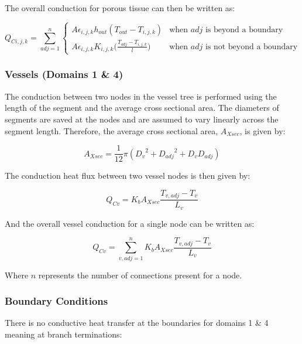 \documentclass[11pt,english,a4paper,twoside,openright]{report}
\begin{document}
{{{{{{{{The overall conduction for porous tissue can then be written as:

\begin{equation}
Q_{Ci,j,k}=\sum_{adj=1}^{n}
\begin{cases}
A\epsilon_{i,j,k}h_{out}(T_{out}-T_{i,j,k}) & \text{when $adj$ is beyond a boundary} \\
A\epsilon_{i,j,k} K_{i,j,k}\big(\frac{T_{adj}-T_{i,j,k}}{l}\big) & \text{when $adj$ is not beyond a boundary}
\end{cases}
\end{equation}

\subsubsection{Vessels (Domains 1 \& 4)}

The conduction between two nodes in the vessel tree is performed using the length of the segment and the average cross sectional area. The diameters of segments are saved at the nodes and are assumed to vary linearly across the segment length. Therefore, the average cross sectional area, $A_{Xsec}$, is given by:

\begin{equation}
A_{Xsec} = \frac{1}{12}\pi({D_{v}}^2 + {D_{adj}}^2+D_{v}D_{adj})
\label{Eq:CrossSectionArea}
\end{equation}

The conduction heat flux between two vessel nodes is then given by:

\begin{equation}
Q_{Cv}=K_{b}A_{Xsec}\frac{T_{v,adj}-T_{v}}{L_{v}}
\end{equation}

And the overall vessel conduction for a single node can be written as:

\begin{equation}
Q_{Cv}=\sum_{v,adj=1}^{n}K_{b}A_{Xsec}\frac{T_{v,adj}-T_{v}}{L_{v}}
\end{equation}

Where $n$ represents the number of connections present for a node.

\subsubsection{Boundary Conditions}

There is no conductive heat transfer at the boundaries for domains 1 \& 4 meaning at branch terminations:

}}}}}}}}
\end{document}
